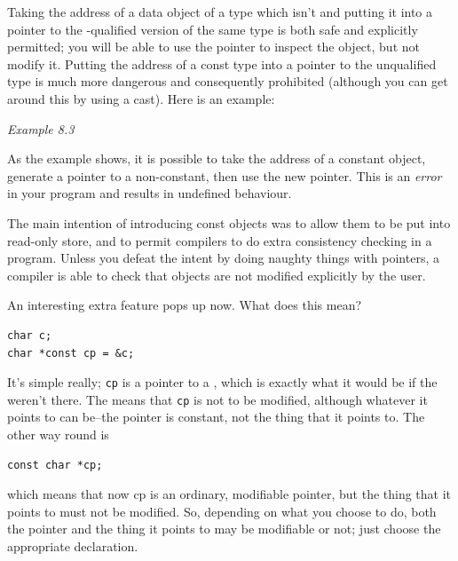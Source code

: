    Taking the address of a data object of a type which isn't
    \const{} and putting it into a pointer to the
    \const-qualified version of the same type is both safe and
    explicitly permitted; you will be able to use the pointer to inspect the
    object, but not modify it. Putting the address of a const type into
    a pointer to the unqualified type is much more dangerous and
    consequently prohibited (although you can get around this by using
    a cast). Here is an example:


    \begin{center}\textit{Example 8.3}\end{center}


   As the example shows, it is possible to take the address of a constant
    object, generate a pointer to a non-constant, then use the new pointer.
    This is an \textit{error} in your program and results in undefined
    behaviour.


   The main intention of introducing const objects was to allow them to
    be put into read-only store, and to permit compilers to do extra
    consistency checking in a program. Unless you defeat the intent by doing
    naughty things with pointers, a compiler is able to check that
    \const{} objects are not modified explicitly by the user.


   An interesting extra feature pops up now. What does this mean?


\begin{Verbatim}
char c;
char *const cp = &c;
\end{Verbatim}

   It's simple really; \texttt{cp} is a pointer to
    a \kchar, which is exactly what it would be if the
    \const{} weren't there. The \const{} means that
    \texttt{cp} is not to be modified, although whatever it points to
    can be--the pointer is constant, not the thing that it points to.
    The other way round is


\begin{Verbatim}
const char *cp;
\end{Verbatim}

   which means that now cp is an ordinary, modifiable pointer, but the
    thing that it points to must not be modified. So, depending on what you
    choose to do, both the pointer and the thing it points to may be
    modifiable or not; just choose the appropriate declaration.



